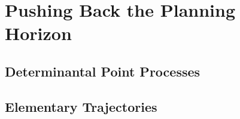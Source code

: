 \section{Pushing Back the Planning Horizon}
\subsection{Determinantal Point Processes}
\subsection{Elementary Trajectories}